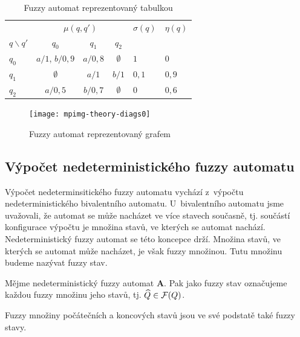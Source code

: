 \begin{table}
 \centering
  \begin{tabular}{|l||c|c|c||l|l|}
    \hline
    ~			& \multicolumn{3}{c||}{$\mu(q, q')$} 			& $\sigma(q)$ 	& $\eta(q)$	\\
    $q \backslash q'$	& $q_0$ 		& $q_1$ 	& $q_2$ 	& ~  		& ~		\\ \hline \hline
    $q_0$ 		& $a/1$, $b/0{,}9$ 	& $a/0{,}8$ 	& $\emptyset$ 	& $1$ 		& $0$		\\ \hline
    $q_1$ 		& $\emptyset$ 		& $a/1$ 	& $b/1$ 	& $0{,}1$ 	& $0{,}9$	\\ \hline
    $q_2$ 		& $a/0{,}5$ 		& $b/0{,}7$ 	& $\emptyset$ 	& $0$ 		& $0{,}6$	\\ \hline
  \end{tabular}

 \caption{Fuzzy automat reprezentovaný tabulkou} \label{tab:FuzAutTab}
\end{table}

\begin{figure}
 \centering
 
 \texttt{[image: mpimg-theory-diags0]}
 
 \caption{Fuzzy automat reprezentovaný grafem} \label{img:FuzAutDiag}
\end{figure}
  

\subsection{Výpočet nedeterministického fuzzy automatu}
Výpočet nedeterminsitického fuzzy automatu vychází z~výpočtu nedeterministického bivalentního automatu. U~bivalentního automatu jsme uvažovali, že automat se může nacházet ve více stavech současně, tj. součástí konfigurace výpočtu je množina stavů, ve kterých se automat nachází. Nedeterministický fuzzy automat se této koncepce drží. Množina stavů, ve kterých se automat může nacházet, je však fuzzy množinou. Tutu množinu budeme nazývat fuzzy stav.

\begin{definition}\label{def-FuzzStav}
 Mějme nedeterministický fuzzy automat $\mathbf{A}$. Pak jako fuzzy stav označujeme každou fuzzy množinu jeho stavů, tj. $\widehat{Q} \in \mathcal{F}(Q)$.
\end{definition}

\begin{note}
 Fuzzy množiny počátečních a koncových stavů jsou ve své podstatě také fuzzy stavy.
\end{note}

